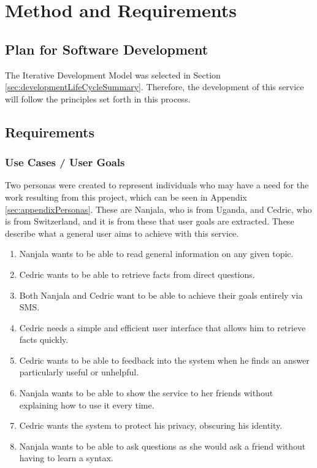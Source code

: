 \documentclass[authoryearcitations]{UoYCSproject}
\begin{document}
\newpage
\chapter{Method and Requirements}
\label{sec:method}

\section{Plan for Software Development}
The Iterative Development Model was selected in Section \ref{sec:developmentLifeCycleSummary}.  Therefore, the development of this service will follow the principles set forth in this process.

\section{Requirements}
\subsection{Use Cases / User Goals}
Two personas were created to represent individuals who may have a need for the work resulting from this project, which can be seen in Appendix \ref{sec:appendixPersonas}. These are Nanjala, who is from Uganda, and Cedric, who is from Switzerland, and it is from these that user goals are extracted. These describe what a general user aims to achieve with this service.
\begin{enumerate}
  \item Nanjala wants to be able to read general information on any given topic.
  \item Cedric wants to be able to retrieve facts from direct questions.
  \item Both Nanjala and Cedric want to be able to achieve their goals entirely via SMS.
  \item Cedric needs a simple and efficient user interface that allows him to retrieve facts quickly. 
  \item Cedric wants to be able to feedback into the system when he finds an answer particularly useful or unhelpful. 
  \item Nanjala wants to be able to show the service to her friends without explaining how to use it every time.
  \item Cedric wants the system to protect his privacy, obscuring his identity.
  \item Nanjala wants to be able to ask questions as she would ask a friend without having to learn a syntax.
\end{enumerate}
\end{document}

